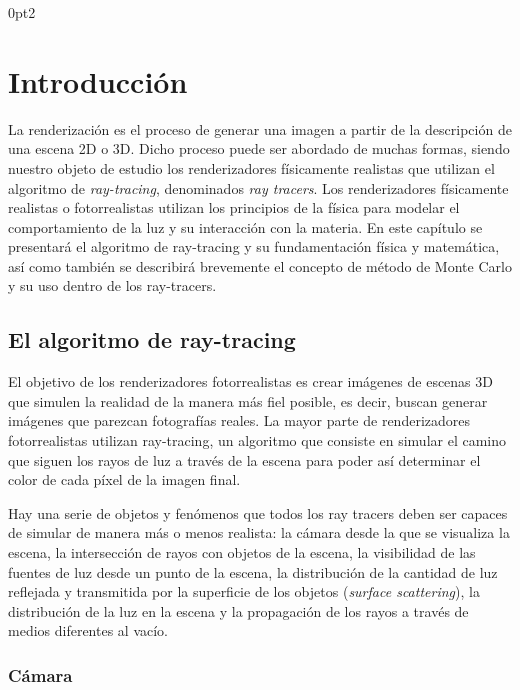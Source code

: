 \titlespacing*{\subsection}
  {0pt}{2\baselineskip}{\baselineskip}

\chapter{Introducción}

La renderización es el proceso de generar una imagen a partir de la descripción de una escena 2D o 3D. Dicho proceso puede ser abordado de muchas formas, siendo nuestro objeto de estudio los renderizadores físicamente realistas que utilizan el algoritmo de \emph{ray-tracing}, denominados \emph{ray tracers}. Los renderizadores físicamente realistas o fotorrealistas utilizan los principios de la física para modelar el comportamiento de la luz y su interacción con la materia. En este capítulo se presentará el algoritmo de ray-tracing y su fundamentación física y matemática, así como también se describirá brevemente el concepto de método de Monte Carlo y su uso dentro de los ray-tracers.

\section{El algoritmo de ray-tracing}

El objetivo de los renderizadores fotorrealistas es crear imágenes de escenas 3D que simulen la realidad de la manera más fiel posible, es decir, buscan generar imágenes que parezcan fotografías reales. La mayor parte de renderizadores fotorrealistas utilizan ray-tracing, un algoritmo que consiste en simular el camino que siguen los rayos de luz a través de la escena para poder así determinar el color de cada píxel de la imagen final.

Hay una serie de objetos y fenómenos que todos los ray tracers deben ser capaces de simular de manera más o menos realista: la cámara desde la que se visualiza la escena, la intersección de rayos con objetos de la escena, la visibilidad de las fuentes de luz desde un punto de la escena, la distribución de la cantidad de luz reflejada y transmitida por la superficie de los objetos (\emph{surface scattering}), la distribución de la luz en la escena y la propagación de los rayos a través de medios diferentes al vacío.
\subsection{Cámara}

